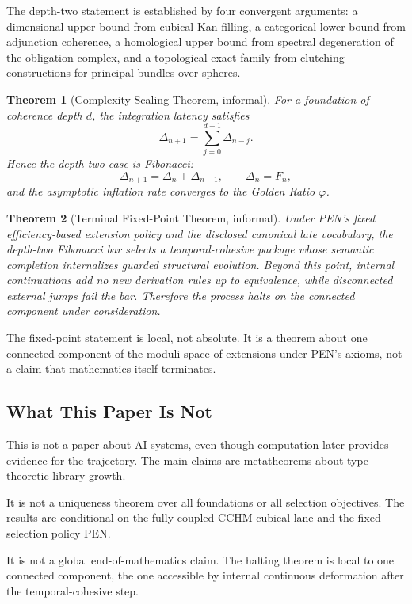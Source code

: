 \documentclass[11pt,a4paper]{article}
\theoremstyle{plain}
\newtheorem{theorem}{Theorem}[section]
\theoremstyle{definition}
\theoremstyle{remark}
\begin{document}
The depth-two statement is established by four convergent arguments: a dimensional upper bound from cubical Kan filling, a categorical lower bound from adjunction coherence, a homological upper bound from spectral degeneration of the obligation complex, and a topological exact family from clutching constructions for principal bundles over spheres.

\begin{theorem}[Complexity Scaling Theorem, informal]
For a foundation of coherence depth $d$, the integration latency satisfies
\[
  \Delta_{n+1}=\sum_{j=0}^{d-1}\Delta_{n-j}.
\]
Hence the depth-two case is Fibonacci:
\[
  \Delta_{n+1}=\Delta_n+\Delta_{n-1},\qquad \Delta_n=F_n,
\]
and the asymptotic inflation rate converges to the Golden Ratio $\varphi$.
\end{theorem}

\begin{theorem}[Terminal Fixed-Point Theorem, informal]
Under PEN's fixed efficiency-based extension policy and the disclosed canonical late vocabulary, the depth-two Fibonacci bar selects a temporal-cohesive package whose semantic completion internalizes guarded structural evolution.  Beyond this point, internal continuations add no new derivation rules up to equivalence, while disconnected external jumps fail the bar.  Therefore the process halts on the connected component under consideration.
\end{theorem}

The fixed-point statement is local, not absolute.  It is a theorem about one connected component of the moduli space of extensions under PEN's axioms, not a claim that mathematics itself terminates.

\subsection{What This Paper Is Not}

This is not a paper about AI systems, even though computation later provides evidence for the trajectory.  The main claims are metatheorems about type-theoretic library growth.

It is not a uniqueness theorem over all foundations or all selection objectives.  The results are conditional on the fully coupled CCHM cubical lane and the fixed selection policy PEN.

It is not a global end-of-mathematics claim.  The halting theorem is local to one connected component, the one accessible by internal continuous deformation after the temporal-cohesive step.
\end{document}
